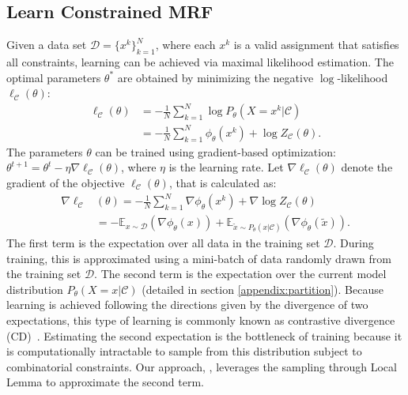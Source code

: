 \subsection{Learn Constrained MRF}
Given a data set $\mathcal{D}=\{x^k\}_{k=1}^N$, where each $x^k$ is a valid
assignment that satisfies all constraints, learning can be achieved via maximal
likelihood estimation. The optimal parameters $\theta^*$ are obtained by
minimizing the negative $\log$-likelihood $\ell_{\mathcal{C}}(\theta)$:%
\begin{equation}  \label{eq:log-likelihood}
    \begin{aligned}
        \ell_{\mathcal{C}}(\theta) & =-\frac{1}{N}\sum_{k=1}^N\log P_{\theta}(X=x^k|\mathcal{C})               \\
                                   & =-\frac{1}{N}\sum_{k=1}^N\phi_{\theta}(x^k)+\log Z_{\mathcal{C}}(\theta).
    \end{aligned}
\end{equation}
The parameters $\theta$ can be trained using gradient-based optimization: $\theta^{t+1}= \theta^{t}-\eta\nabla\ell_{\mathcal{C}}(\theta)$, where $\eta$ is the learning rate. Let $\nabla\ell_{\mathcal{C}}(\theta)$ denote the gradient of the objective $\ell_{\mathcal{C}}(\theta)$, that is calculated as:
\begin{equation}
    \begin{aligned}\label{eq:gradient}
        \nabla\ell_{\mathcal{C}} & (\theta)=-\frac{1}{N}\sum_{k=1}^N\nabla \phi_{\theta}(x^k)+ \nabla\log Z_{\mathcal{C}}(\theta)                                                                           \\
                                 & =-\mathbb{E}_{{x}\sim \mathcal{D}}\left(\nabla\phi_{\theta}({x})\right)+\mathbb{E}_{\tilde{x}\sim P_{\theta}(x|\mathcal{C})}\left(\nabla\phi_{\theta}(\tilde{x})\right).
    \end{aligned}
\end{equation}
The first term is the expectation over all data in the training set $\mathcal{D}$.
%
During training, this is approximated using a mini-batch of data randomly drawn
from the training set $\mathcal{D}$.
%
The second term is the expectation over the current model distribution
$P_\theta(X=x|\mathcal{C})$ (detailed in section \ref{appendix:partition}).
%
Because learning is achieved following the directions given by the divergence
of two expectations, this type of learning is commonly known as contrastive
divergence (CD)~\citep{DBLP:journals/neco/Hinton02}.
%
Estimating the second expectation is the bottleneck of training because it is
computationally intractable to sample from this distribution subject to
combinatorial constraints.
%
Our approach, \nls, leverages the sampling through \lovasz Local Lemma to
approximate the second term.

